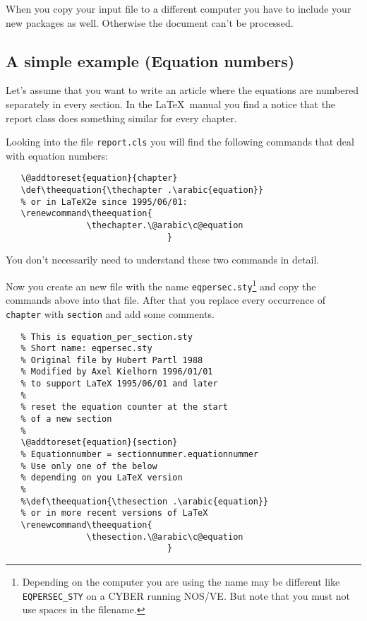 \documentclass[twoside,a4paper]{refart}
\begin{document}
\attention
When you copy your input file to a different computer you have to 
include your new packages as well. Otherwise the document can't be 
processed.


\subsection{A simple example (Equation numbers)}

Let's assume that you want to write an article where the equations are 
numbered separately in every section. In the \LaTeX\ manual you find a 
notice that the report class does something similar for every chapter.

Looking into the file \texttt{report.cls} you will find the following 
commands that deal with equation numbers:\nopagebreak
\begin{verbatim}
   \@addtoreset{equation}{chapter}
   \def\theequation{\thechapter .\arabic{equation}}
   % or in LaTeX2e since 1995/06/01:
   \renewcommand\theequation{
                \thechapter.\@arabic\c@equation
                                }
\end{verbatim}

You don't necessarily need to understand these two commands in detail.

Now you create an new file with the name 
\texttt{eqpersec.sty}\footnote{Depending on the computer you are using 
the name may be different like \texttt{EQPERSEC\_STY} on a CYBER 
running NOS/VE. But note that you must not use spaces in the 
filename.} and copy the commands above into that file.  After that 
you replace every occurrence of \texttt{chapter} with \texttt{section} 
and add some comments.\nopagebreak
\begin{verbatim}
   % This is equation_per_section.sty
   % Short name: eqpersec.sty
   % Original file by Hubert Partl 1988
   % Modified by Axel Kielhorn 1996/01/01
   % to support LaTeX 1995/06/01 and later
   %
   % reset the equation counter at the start
   % of a new section 
   % 
   \@addtoreset{equation}{section}
   % Equationnumber = sectionnummer.equationnummer
   % Use only one of the below 
   % depending on you LaTeX version
   % 
   %\def\theequation{\thesection .\arabic{equation}}
   % or in more recent versions of LaTeX
   \renewcommand\theequation{
                \thesection.\@arabic\c@equation
                                }
\end{verbatim}
\end{document}
